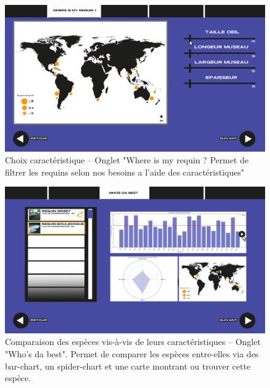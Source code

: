 \documentclass{article}
\begin{document}
\begin{figure}[!h]
	\centering
	\includegraphics[width=14.4cm]{assets/prototype/basse/onglet2}
	\caption{ Choix caractéristique – Onglet "Where is my requin ? Permet de filtrer les requins selon nos besoins a l'aide des caractéristiques"}
    \label{onglet2}
\end{figure}

\begin{figure}[!h]
	\centering
	\includegraphics[width=14.4cm]{assets/prototype/basse/onglet3}
	\caption{ Comparaison des espèces vis-à-vis de leurs caractéristiques – Onglet "Who's da best". Permet de comparer les espèces entre-elles via des bar-chart, un spider-chart et une carte montrant ou trouver cette espèce.}
    \label{onglet3}
\end{figure}

\vspace{1cm}
\end{document}
